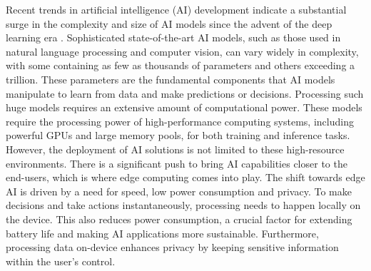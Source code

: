 Recent trends in artificial intelligence (AI) development indicate a substantial surge in the complexity and size of AI models since the advent of the deep learning era \autocite{EpochNotableModels2024}.
Sophisticated state-of-the-art AI models, such as those used in natural language processing and computer vision, can vary widely in complexity, with some containing as few as thousands of parameters and others exceeding a trillion.
These parameters are the fundamental components that AI models manipulate to learn from data and make predictions or decisions.
Processing such huge models requires an extensive amount of computational power.
These models require the processing power of high-performance computing systems, including powerful GPUs and large memory pools, for both training and inference tasks.
However, the deployment of AI solutions is not limited to these high-resource environments.
There is a significant push to bring AI capabilities closer to the end-users, which is where edge computing comes into play.
The shift towards edge AI is driven by a need for speed, low power consumption and privacy.
To make decisions and take actions instantaneously, processing needs to happen locally on the device.
This also reduces power consumption, a crucial factor for extending battery life and making AI applications more sustainable. 
Furthermore, processing data on-device enhances privacy by keeping sensitive information within the user's control.
